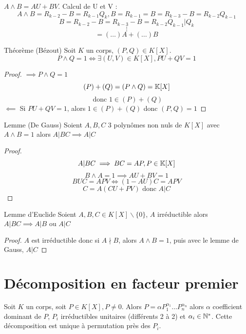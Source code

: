 \documentclass[]{report}
\begin{document}
    \begin{re}{}{}
        $A\wedge B=AU+BV$. Calcul de U et V :$$A\wedge B=R_{k-2}-B=R_{k-1}Q_k, B=R_{k-1}=B=R_{k-3}-B=R_{k-2}Q_{k-1}$$
        $$B=R_{k-2}-B=R_{k-3}-B=R_{k-2}Q_{k-1}|Q_k$$
        $$\vdots$$
        $$=(\dots)A+(\dots)B$$
    \end{re}

    \begin{tm}{Théorème (Bézout)}{}
        Soit $K$ un corps, $(P,Q)\in K[X]$. $$P\wedge Q=1\iff \exists(U,V)\in K[X], PU+QV=1$$
    \end{tm}

    \begin{proof}
        $\implies P\wedge Q=1$
        \[(P)+(Q)=(P\wedge Q)=\mathbb{K} [X]\]
        \[\text{ donc }1\in (P)+(Q)\]
        $\impliedby$ Si $PU+QV=1$, alors $1\in (P)+(Q)$ donc $(P,Q)=1$
    \end{proof}

    \begin{lm}{Lemme (De Gauss)}{}
        Soient $A,B,C$ 3 polynômes non nuls de $K[X]$ avec $A\wedge B=1$ alors $ A|BC \implies A|C$
    \end{lm}

    \begin{proof}
        \[A|BC\implies BC=AP,P\in \mathbb{K}[X]\]
        \[B\wedge A=1\implies AU+BV=1\]
        \[BU C=APV\iff (1-AU)C=APV\]
        \[C=A(CU+PV)\text{ donc }A|C\]
    \end{proof}

    \begin{lm}{Lemme d'Euclide}{}
        Soient $A,B,C\in K[X]\backslash\{0\}$, $A$ irréductible alors $A|BC \implies A|B$ ou $A|C$
    \end{lm}

    \begin{proof}
        $A$ est irréductible donc si $A\nmid B$, alors $A\wedge B=1$, puis avec le lemme de Gauss, $A|C$
    \end{proof}

    \section{Décomposition en facteur premier}

    \begin{tm}{}{}
        Soit $K$ un corps, soit $P\in K[X],P\neq 0$. Alors $P=\alpha P_1^{\alpha_1}\dots P_n^{\alpha_n}$ alors $\alpha$ coefficient dominant de $P$, $P_i$ irréductibles unitaires (différents 2 à 2) et $\alpha_i\in\mathbb{N}^*$. Cette décomposition est unique à permutation près des $P_i$.
    \end{tm}
\end{document}
